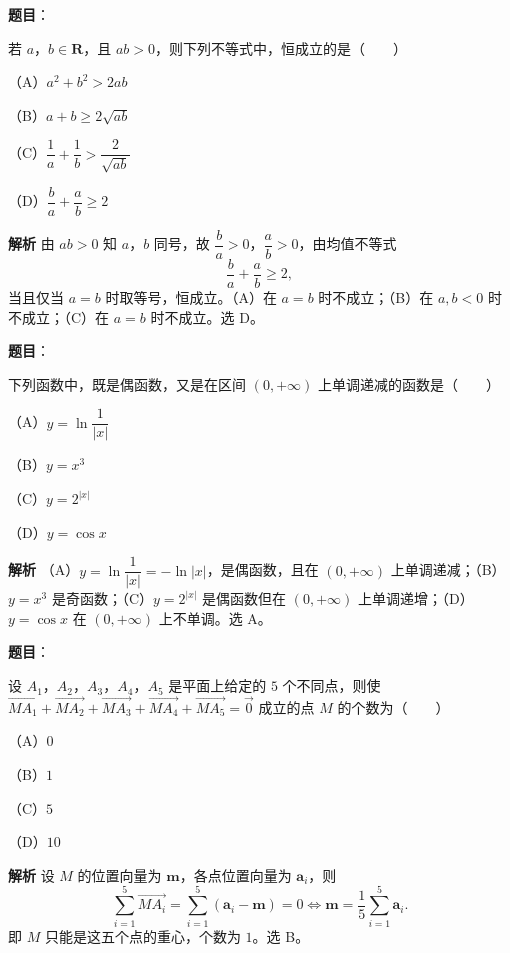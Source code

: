 \begin{answer}

\textbf{题目}：

若 $a$，$b\in\mathbf R$，且 $ab>0$，则下列不等式中，恒成立的是\mbox{（　　）}

（A）$a^2+b^2>2ab$

（B）$a+b\geqslant2\sqrt{ab}$

（C）$\dfrac1a+\dfrac1b>\dfrac2{\sqrt{ab}}$

（D）$\dfrac ba+\dfrac ab\geqslant2$

\textbf{解析}
由 $ab>0$ 知 $a$，$b$ 同号，故 $\dfrac ba>0$，$\dfrac ab>0$，由均值不等式
\nopagebreak[4]
\[\frac ba+\frac ab\geqslant2,\]
当且仅当 $a=b$ 时取等号，恒成立。（A）在 $a=b$ 时不成立；（B）在 $a,b<0$ 时不成立；（C）在 $a=b$ 时不成立。选 D。


\end{answer}
\begin{answer}

\textbf{题目}：

下列函数中，既是偶函数，又是在区间 $(0,+\infty)$ 上单调递减的函数是\mbox{（　　）}

（A）$y=\ln\dfrac1{|x|}$

（B）$y=x^3$

（C）$y=2^{|x|}$

（D）$y=\cos x$

\textbf{解析}
（A）$y=\ln\dfrac1{|x|}=-\ln|x|$，是偶函数，且在 $(0,+\infty)$ 上单调递减；（B）$y=x^3$ 是奇函数；（C）$y=2^{|x|}$ 是偶函数但在 $(0,+\infty)$ 上单调递增；（D）$y=\cos x$ 在 $(0,+\infty)$ 上不单调。选 A。


\end{answer}
\begin{answer}

\textbf{题目}：

设 $A_1$，$A_2$，$A_3$，$A_4$，$A_5$ 是平面上给定的 $5$ 个不同点，则使 $\overrightarrow{MA_1}+\overrightarrow{MA_2}+\overrightarrow{MA_3}+\overrightarrow{MA_4}+\overrightarrow{MA_5}=\vec 0$ 成立的点 $M$ 的个数为\mbox{（　　）}

（A）$0$

（B）$1$

（C）$5$

（D）$10$

\textbf{解析}
设 $M$ 的位置向量为 $\boldsymbol m$，各点位置向量为 $\boldsymbol a_i$，则
\nopagebreak[4]
\[\sum_{i=1}^5\overrightarrow{MA_i}=\sum_{i=1}^5(\boldsymbol a_i-\boldsymbol m)=0\iff \boldsymbol m=\frac15\sum_{i=1}^5\boldsymbol a_i.\]
即 $M$ 只能是这五个点的重心，个数为 $1$。选 B。


\end{answer}
